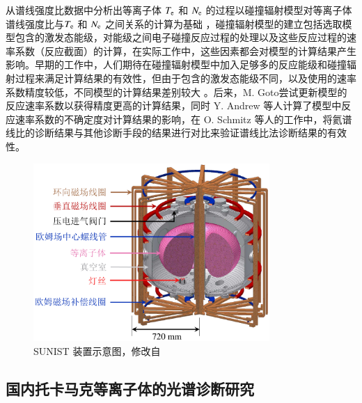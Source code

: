 从谱线强度比数据中分析出等离子体 $T_{\rm e}$ 和 $N_{\rm e}$ 的过程以碰撞辐射模型对等离子体谱线强度比与$T_{\rm e}$ 和 $N_{\rm e}$ 之间关系的计算为基础
\cite{Fujimoto1979-HeCR,Goto2003-HeCRM,boivin2001}，碰撞辐射模型的建立包括选取模型包含的激发态能级，对能级之间电子碰撞反应过程的处理以及这些反应过程的速率系数（反应截面）的计算，在实际工作中，这些因素都会对模型的计算结果产生影响。早期的工作中\cite{Fujimoto1979-HeCR}，人们期待在碰撞辐射模型中加入足够多的反应能级和碰撞辐射过程来满足计算结果的有效性，但由于包含的激发态能级不同，以及使用的速率系数精度较低\cite{Summers:IAEAdatarequirement}，不同模型的计算结果差别较大
\cite{Boivin2007}。后来，M. Goto\cite{Goto2003-HeCRM}尝试更新模型的反应速率系数以获得精度更高的计算结果，同时 Y. Andrew 等人\cite{Andrew2000PPCFSensitivity}计算了模型中反应速率系数的不确定度对计算结果的影响，在 O. Schmitz 等人\cite{Schmitz2008}的工作中，将氦谱线比的诊断结果与其他诊断手段的结果进行对比来验证谱线比法诊断结果的有效性。

\begin{figure}%
  \centering
  \includegraphics[width=0.8\textwidth]{SUNIST-Sketch-14_cropped.pdf}
  \caption{SUNIST 装置示意图，修改自}
  \label{fig:chap01:sunist-sketch}
\end{figure}

\subsection{国内托卡马克等离子体的光谱诊断研究}

